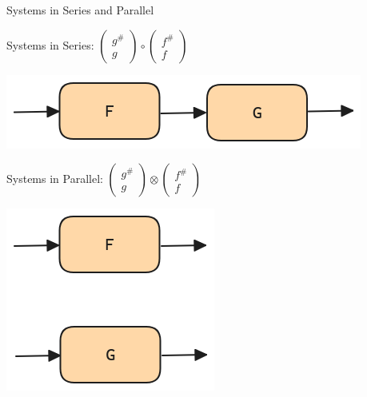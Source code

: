 \documentclass{beamer}
\begin{document}
\begin{frame}{Systems in Series and Parallel}
    \begin{center}
        \begin{large}
            Systems in Series:
            $\begin{pmatrix}g^\# \\ g\end{pmatrix} \circ \begin{pmatrix}f^\# \\ f\end{pmatrix}$

            \includegraphics[scale=0.25]{Systems_Series.png}

            \vspace*{0.25in}
            Systems in Parallel:
            $\begin{pmatrix}g^\# \\ g\end{pmatrix} \otimes \begin{pmatrix}f^\# \\ f\end{pmatrix}$

            \includegraphics[scale=0.25]{Systems_Parallel.png}
        \end{large}
    \end{center}




\end{frame}

\end{document}
